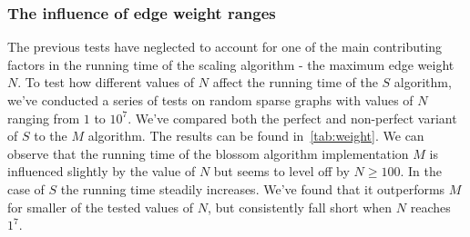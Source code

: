 \begin{table}
\centering
{}
\caption{Results on random dense graphs when looking for a perfect matching}\label{tab:perfect_dense}
\end{table}

\subsubsection*{The influence of edge weight ranges}

The previous tests have neglected to account for one of the main contributing factors in the running time of the scaling algorithm - the maximum edge weight $N$. To test how different values of $N$ affect the running time of the $S$ algorithm, we've conducted a series of tests on random sparse graphs with values of $N$ ranging from $1$ to $10^7$. We've compared both the perfect and non-perfect variant of $S$ to the $M$ algorithm. The results can be found in~\ref{tab:weight}. We can observe that the running time of the blossom algorithm implementation $M$ is influenced slightly by the value of $N$ but seems to level off by $N \geq 100$. In the case of $S$ the running time steadily increases. We've found that it outperforms $M$ for smaller of the tested values of $N$, but consistently fall short when $N$ reaches $1^7$.

